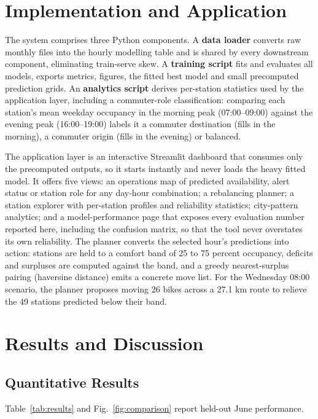 \documentclass[conference]{IEEEtran}
\begin{document}
\section{Implementation and Application}
The system comprises three Python components. A \textbf{data loader} converts raw monthly files into the hourly modelling table and is shared by every downstream component, eliminating train-serve skew. A \textbf{training script} fits and evaluates all models, exports metrics, figures, the fitted best model and small precomputed prediction grids. An \textbf{analytics script} derives per-station statistics used by the application layer, including a commuter-role classification: comparing each station's mean weekday occupancy in the morning peak (07:00--09:00) against the evening peak (16:00--19:00) labels it a commuter destination (fills in the morning), a commuter origin (fills in the evening) or balanced.

The application layer is an interactive Streamlit dashboard that consumes only the precomputed outputs, so it starts instantly and never loads the heavy fitted model. It offers five views: an operations map of predicted availability, alert status or station role for any day-hour combination; a rebalancing planner; a station explorer with per-station profiles and reliability statistics; city-pattern analytics; and a model-performance page that exposes every evaluation number reported here, including the confusion matrix, so that the tool never overstates its own reliability. The planner converts the selected hour's predictions into action: stations are held to a comfort band of 25 to 75 percent occupancy, deficits and surpluses are computed against the band, and a greedy nearest-surplus pairing (haversine distance) emits a concrete move list. For the Wednesday 08:00 scenario, the planner proposes moving 26 bikes across a 27.1 km route to relieve the 49 stations predicted below their band.

\section{Results and Discussion}
\subsection{Quantitative Results}
Table~\ref{tab:results} and Fig.~\ref{fig:comparison} report held-out June performance.
\end{document}
